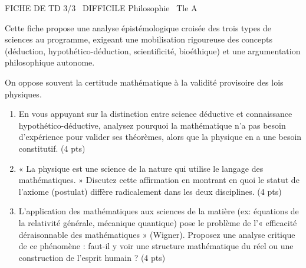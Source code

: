 \documentclass[11pt]{article}
\begin{document}
\begin{tcolorbox}[enhanced,colback=popink,colframe=popink,arc=10pt,boxrule=0pt,left=12pt,right=12pt,top=9pt,bottom=9pt]
{\color{white}\popxbold\small FICHE DE TD 3/3 \textbullet\ DIFFICILE \hfill Philosophie \textbullet\ Tle A\par}
\end{tcolorbox}
\vspace{4pt}
Cette fiche propose une analyse épistémologique croisée des trois types de sciences au programme, exigeant une mobilisation rigoureuse des concepts (déduction, hypothético-déduction, scientificité, bioéthique) et une argumentation philosophique autonome.

\begin{exercice}
On oppose souvent la certitude mathématique à la validité provisoire des lois physiques. 
\begin{enumerate}
    \item En vous appuyant sur la distinction entre science déductive et connaissance hypothético-déductive, analysez pourquoi la mathématique n'a pas besoin d'expérience pour valider ses théorèmes, alors que la physique en a une besoin constitutif. (4 pts)
    \item « La physique est une science de la nature qui utilise le langage des mathématiques. » Discutez cette affirmation en montrant en quoi le statut de l'axiome (postulat) diffère radicalement dans les deux disciplines. (4 pts)
    \item L'application des mathématiques aux sciences de la matière (ex: équations de la relativité générale, mécanique quantique) pose le problème de l'« efficacité déraisonnable des mathématiques » (Wigner). Proposez une analyse critique de ce phénomène : faut-il y voir une structure mathématique du réel ou une construction de l'esprit humain ? (4 pts)
\end{enumerate}
\end{exercice}
\end{document}
